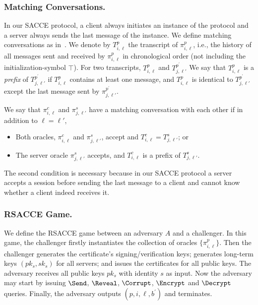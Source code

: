 \subsubsection{Matching Conversations.}
In our SACCE protocol, a client always initiates an instance of the protocol and
a server always sends the last message of the instance.
We define matching conversations as in~\cite{JKSS12:ACCE}.
We denote by $T^p_{i,\ell}$ the transcript of $\pi^p_{i,\ell}$, i.e., the history of
all messages sent and received by $\pi^p_{i,\ell}$ in chronological order (not including the initialization-symbol $\top$).
For two transcripts, $T^p_{i,\ell}$ and $T^{p^{\prime}}_{j,\ell'}$
We say that $T^p_{i,\ell}$ is a \textit{prefix} of $T^{p^{\prime}}_{j,\ell'}$ if
$T^p_{i,\ell}$ contains at least one message, and
$T^p_{i,\ell}$ is identical to $T^{p^{\prime}}_{j,\ell'}$ except the last message sent
by $\pi^{p^{\prime}}_{j,\ell'}$.

\begin{definition}
 We say that $\pi^c_{i,\ell}$ and $\pi^s_{j,\ell'}$ have a matching conversation with each other if  in addition to $\ell=\ell'$,
 \begin{itemize}
  \item{Both oracles, $\pi^c_{i, \ell}$ and $\pi^s_{j,\ell'}$, accept and
  $T^c_{i,\ell} = T^s_{j,\ell'}$; or }
  \item{The server oracle $\pi^s_{j, \ell'}$ accepts,
  and $T^c_{i,\ell}$ is a prefix of $T^s_{j,\ell'}$.}
 \end{itemize}
\end{definition}
\begin{remark}
 The second condition is necessary because in our SACCE protocol
 a server accepts a session before sending the last message to a client
 and cannot know whether a client indeed receives it.
\end{remark}

\subsubsection{RSACCE Game.}
We define the RSACCE game between an adversary $A$ and a challenger.
In this game, the challenger firstly instantiates the collection of oracles
$\{\pi^p_{i,\ell}\}$.
Then the challenger generates the certificate's signing/verification keys;
generates long-term keys $(pk_s, sk_s)$ for all servers;
and issues the certificates for all public keys.
The adversary receives all public keys $pk_s$ with identity $s$ as input.
Now the adversary may start by issuing $\Send$, $\Reveal$, $\Corrupt$, $\Encrypt$ and $\Decrypt$ queries.
Finally, the adversary outputs $(p, i, \ell, b^{\prime})$ and terminates.

